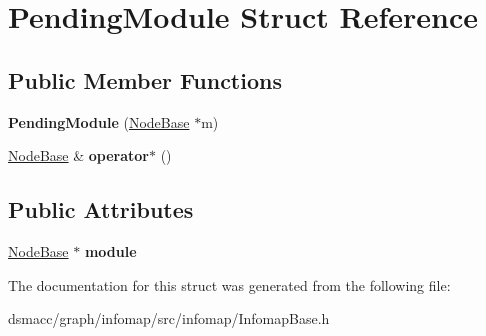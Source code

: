 \hypertarget{structPendingModule}{}\section{Pending\+Module Struct Reference}
\label{structPendingModule}
\subsection*{Public Member Functions}
\begin{DoxyCompactItemize}
\item 
\mbox{\label{structPendingModule_a627cde11e4bf3015894f5c2879cab49e}} 
{\bfseries Pending\+Module} (\mbox{\hyperlink{classNodeBase}{Node\+Base}} $\ast$m)
\item 
\mbox{\label{structPendingModule_ad53f1a7d1cae806ca1c158b982c95d2c}} 
\mbox{\hyperlink{classNodeBase}{Node\+Base}} \& {\bfseries operator$\ast$} ()
\end{DoxyCompactItemize}
\subsection*{Public Attributes}
\begin{DoxyCompactItemize}
\item 
\mbox{\label{structPendingModule_ac40a663cb78ff5f319e02ac1fe34ec1a}} 
\mbox{\hyperlink{classNodeBase}{Node\+Base}} $\ast$ {\bfseries module}
\end{DoxyCompactItemize}


The documentation for this struct was generated from the following file\+:\begin{DoxyCompactItemize}
\item 
dsmacc/graph/infomap/src/infomap/Infomap\+Base.\+h\end{DoxyCompactItemize}
